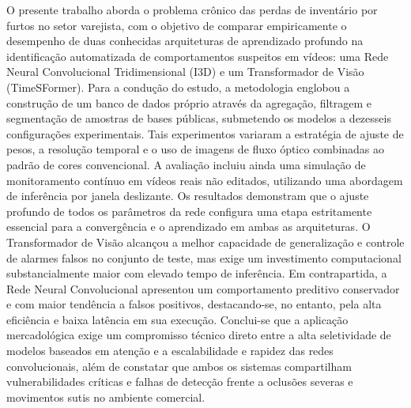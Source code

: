 \documentclass[12pt, %
openright, 
oneside, %
a4paper,    %
brazil]{facom-ufu-abntex2}
\begin{document}
\begin{resumo} %

O presente trabalho aborda o problema crônico das perdas de inventário por furtos no setor varejista, com o objetivo de comparar empiricamente o desempenho de duas conhecidas arquiteturas de aprendizado profundo na identificação automatizada de comportamentos suspeitos em vídeos: uma Rede Neural Convolucional Tridimensional (I3D) e um Transformador de Visão (TimeSFormer). Para a condução do estudo, a metodologia englobou a construção de um banco de dados próprio através da agregação, filtragem e segmentação de amostras de bases públicas, submetendo os modelos a dezesseis configurações experimentais. Tais experimentos variaram a estratégia de ajuste de pesos, a resolução temporal e o uso de imagens de fluxo óptico combinadas ao padrão de cores convencional. A avaliação incluiu ainda uma simulação de monitoramento contínuo em vídeos reais não editados, utilizando uma abordagem de inferência por janela deslizante. Os resultados demonstram que o ajuste profundo de todos os parâmetros da rede configura uma etapa estritamente essencial para a convergência e o aprendizado em ambas as arquiteturas. O Transformador de Visão alcançou a melhor capacidade de generalização e controle de alarmes falsos no conjunto de teste, mas exige um investimento computacional substancialmente maior com elevado tempo de inferência. Em contrapartida, a Rede Neural Convolucional apresentou um comportamento preditivo conservador e com maior tendência a falsos positivos, destacando-se, no entanto, pela alta eficiência e baixa latência em sua execução. Conclui-se que a aplicação mercadológica exige um compromisso técnico direto entre a alta seletividade de modelos baseados em atenção e a escalabilidade e rapidez das redes convolucionais, além de constatar que ambos os sistemas compartilham vulnerabilidades críticas e falhas de detecção frente a oclusões severas e movimentos sutis no ambiente comercial.

 \vspace{\onelineskip}
    
 \noindent
\end{resumo}
\end{document}
